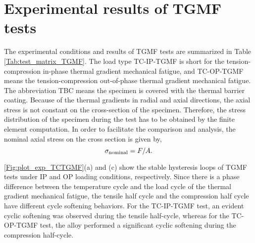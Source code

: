 \documentclass[preprint,5p,twocolumn,11pt,sort&compress]{elsarticle}
\begin{document}

\section{Experimental results of TGMF tests}
\noindent
The experimental conditions and results of TGMF tests are summarized in Table \autoref{Tab:test_matrix_TGMF}. The load type TC-IP-TGMF is short for the tension-compression in-phase thermal gradient mechanical fatigue, and TC-OP-TGMF means the tension-compression out-of-phase thermal gradient mechanical fatigue. The abbreviation TBC means the specimen is covered with the thermal barrier coating.
Because of the thermal gradients in radial and axial directions, the axial stress is not constant on the cross-section of the specimen.
Therefore, the stress distribution of the specimen during the test has to be obtained by the finite element computation.
In order to facilitate the comparison and analysis, the nominal axial stress on the cross section is given by,
\[\sigma_{\rm{nominal}} = F/A.\]

\autoref{Fig:plot_exp_TCTGMF}(a) and (c) show the stable hysteresis loops of TGMF tests under IP and OP loading conditions, respectively.
Since there is a phase difference between the temperature cycle and the load cycle of the thermal gradient mechanical fatigue, the tensile half cycle and the compression half cycle have different cycle softening behaviors.
For the TC-IP-TGMF test, an evident cyclic softening was observed during the tensile half-cycle, whereas for the TC-OP-TGMF test, the alloy performed a significant cyclic softening during the compression half-cycle.
\end{document}
